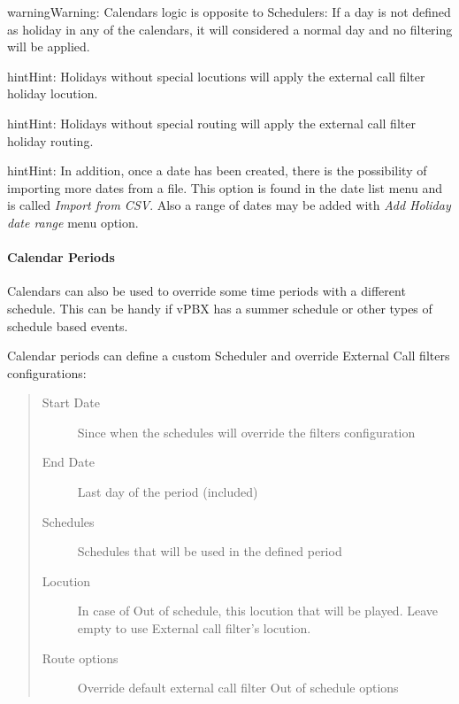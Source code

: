 \documentclass[letterpaper,10pt,english]{sphinxmanual}
\begin{document}
\begin{notice}{warning}{Warning:}
Calendars logic is opposite to Schedulers: If a day is not defined
as holiday in any of the calendars, it will considered a normal day and no
filtering will be applied.
\end{notice}

\begin{notice}{hint}{Hint:}
Holidays without special locutions will apply the external call filter
holiday locution.
\end{notice}

\begin{notice}{hint}{Hint:}
Holidays without special routing will apply the external call filter
holiday routing.
\end{notice}

\begin{notice}{hint}{Hint:}
In addition, once a date has been created, there is the possibility of
importing more dates from a file. This option is found in the date list menu and
is called \emph{Import from CSV}.
Also a range of dates may be added with \emph{Add Holiday date range} menu option.
\end{notice}


\paragraph{Calendar Periods}
\label{administration_portal/client/vpbx/routing_tools/calendars:calendar-periods}\label{administration_portal/client/vpbx/routing_tools/calendars:id2}
Calendars can also be used to override some time periods with a different schedule.
This can be handy if vPBX has a summer schedule or other types of schedule based events.

Calendar periods can define a custom Scheduler and override External Call filters configurations:
\begin{quote}
\begin{description}
\item[{Start Date}] \leavevmode
Since when the schedules will override the filters configuration

\item[{End Date}] \leavevmode
Last day of the period (included)

\item[{Schedules}] \leavevmode
Schedules that will be used in the defined period

\item[{Locution}] \leavevmode
In case of Out of schedule, this locution that will be played. Leave empty to use External
call filter's locution.

\item[{Route options}] \leavevmode
Override default external call filter Out of schedule options

\end{description}
\end{quote}
\end{document}
